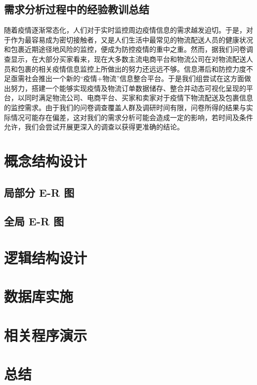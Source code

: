 \documentclass[12pt]{article}
\begin{document}
\subsection{需求分析过程中的经验教训总结}

随着疫情逐渐常态化，人们对于实时监控周边疫情信息的需求越发迫切。于是，对于作为最容易成为密切接触者，又是人们生活中最常见的物流配送人员的健康状况和包裹近期途径地风险的监控，便成为防控疫情的重中之重。然而，据我们问卷调查显示，在大部分买家看来，现在大多数主流电商平台和物流公司在对物流配送人员和包裹的相关疫情信息监控上所做出的努力还远远不够。信息滞后和防控力度不足亟需社会推出一个新的“疫情+物流”信息整合平台。于是我们组尝试在这方面做出努力，搭建一个能够实现疫情及物流订单数据储存、整合并动态可视化呈现的平台，以同时满足物流公司、电商平台、买家和卖家对于疫情下物流配送及包裹信息的监控需求。由于我们的问卷调查覆盖人群及调研时间有限，问卷所得的结果与实际情况可能存在偏差，这对我们的需求分析可能会造成一定的影响，若时间及条件允许，我们会尝试开展更深入的调查以获得更准确的结论。

\section{概念结构设计}

\subsection{局部分 E-R 图 }

\subsection{全局 E-R 图 }

\section{逻辑结构设计}
\section{数据库实施}
\section{相关程序演示}
\section{总结}
\end{document}
